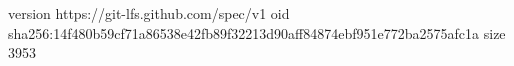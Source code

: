 version https://git-lfs.github.com/spec/v1
oid sha256:14f480b59cf71a86538e42fb89f32213d90aff84874ebf951e772ba2575afc1a
size 3953
